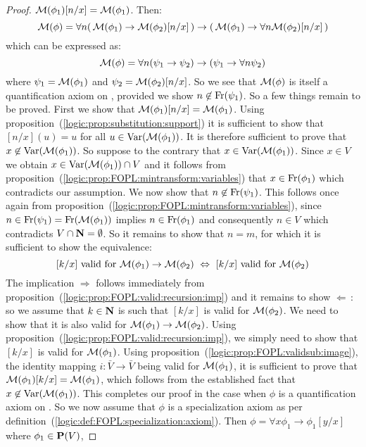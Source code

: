 \begin{proof}
${\cal M}(\phi_{1})[n/x]={\cal M}(\phi_{1})$. Then:
    \[
    {\cal M}(\phi)=\forall n(\,{\cal M}(\phi_{1})\to{\cal
    M}(\phi_{2})[n/x]\,)\to(\,{\cal M}(\phi_{1})\to\forall n{\cal
    M}(\phi_{2})[n/x]\,)
    \]
which can be expressed as:
    \[
    {\cal M}(\phi)=\forall
    n(\psi_{1}\to\psi_{2})\to(\psi_{1}\to\forall n\psi_{2})
    \]
where $\psi_{1}={\cal M}(\phi_{1})$ and $\psi_{2}={\cal
M}(\phi_{2})[n/x]$. So we see that ${\cal M}(\phi)$ is itself a
quantification axiom on \pvb, provided we show
$n\not\in\mbox{\rm Fr}(\psi_{1})$. So a few things remain to be proved.
First we show that ${\cal M}(\phi_{1})[n/x]={\cal M}(\phi_{1})$.
Using proposition~(\ref{logic:prop:substitution:support}) it is
sufficient to show that $[n/x](u)=u$ for all $u\in\mbox{\rm Var}({\cal
M}(\phi_{1}))$. It is therefore sufficient to prove that
$x\not\in\mbox{\rm Var}({\cal M}(\phi_{1}))$. So suppose to the contrary that
$x\in\mbox{\rm Var}({\cal M}(\phi_{1}))$. Since $x\in V$ we obtain
$x\in\mbox{\rm Var}({\cal M}(\phi_{1}))\cap V$ and it follows from
proposition~(\ref{logic:prop:FOPL:mintransform:variables}) that
$x\in\mbox{\rm Fr}(\phi_{1})$ which contradicts our assumption. We now show
that $n\not\in\mbox{\rm Fr}(\psi_{1})$. This follows once again from
proposition~(\ref{logic:prop:FOPL:mintransform:variables}), since
$n\in\mbox{\rm Fr}(\psi_{1})=\mbox{\rm Fr}({\cal M}(\phi_{1}))$ implies
$n\in\mbox{\rm Fr}(\phi_{1})$ and consequently $n\in V$ which contradicts
$V\cap\mbox{$\bf N$}=\emptyset$. So it remains to show that $n=m$, for which it
is sufficient to show the equivalence:
    \[
    \mbox{$[k/x]$ valid for ${\cal M}(\phi_{1})\to{\cal M}(\phi_{2})$}\ \Leftrightarrow\
    \mbox{$[k/x]$ valid for ${\cal M}(\phi_{2})$}
    \]
The implication $\Rightarrow$ follows immediately from
proposition~(\ref{logic:prop:FOPL:valid:recursion:imp}) and it
remains to show $\Leftarrow$\,: so we assume that $k\in\mbox{$\bf N$}$ is such
that $[k/x]$ is valid for ${\cal M}(\phi_{2})$. We need to show that
it is also valid for ${\cal M}(\phi_{1})\to{\cal M}(\phi_{2})$.
Using proposition~(\ref{logic:prop:FOPL:valid:recursion:imp}), we
simply need to show that $[k/x]$ is valid for ${\cal M}(\phi_{1})$.
Using proposition~(\ref{logic:prop:FOPL:validsub:image}), the
identity mapping $i:\bar{V}\to\bar{V}$ being valid for ${\cal
M}(\phi_{1})$, it is sufficient to prove that ${\cal
M}(\phi_{1})[k/x]={\cal M}(\phi_{1})$, which follows from the
established fact that $x\not\in\mbox{\rm Var}({\cal M}(\phi_{1}))$. This
completes our proof in the case when $\phi$ is a quantification
axiom on \pv. So we now assume that $\phi$ is a specialization axiom
as per definition~(\ref{logic:def:FOPL:specialization:axiom}). Then
$\phi=\forall x\phi_{1}\to\phi_{1}[y/x]$ where $\phi_{1}\in\mbox{${\bf P}(V)$}$,

\end{proof}
